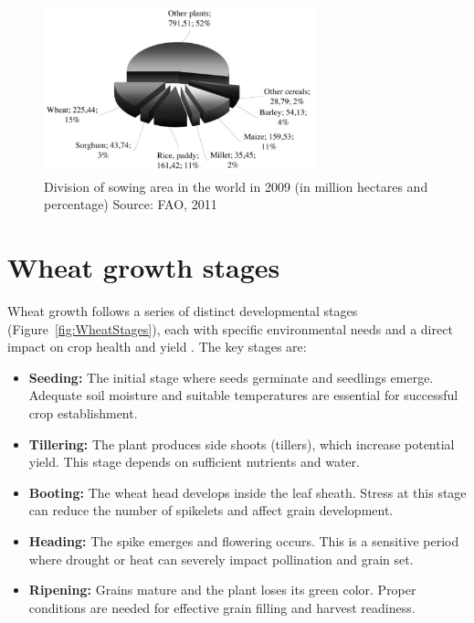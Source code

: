 \begin{figure}[H]
    \centering
    \includegraphics[width=0.7\textwidth]{chapters/chapter2/images/Figure01.png}
    \caption{Division of sowing area in the world in 2009 (in million hectares and percentage) Source: FAO, 2011}
    \label{fig:Figure01}
\end{figure}

\section{Wheat growth stages}
Wheat growth follows a series of distinct developmental stages (Figure~\ref{fig:WheatStages}), each with specific environmental needs and a direct impact on crop health and yield \parencite{shafi2020multi}. The key stages are:

\begin{itemize}
    \item \textbf{Seeding:} The initial stage where seeds germinate and seedlings emerge. Adequate soil moisture and suitable temperatures are essential for successful crop establishment.
    
    \item \textbf{Tillering:} The plant produces side shoots (tillers), which increase potential yield. This stage depends on sufficient nutrients and water.
    
    \item \textbf{Booting:} The wheat head develops inside the leaf sheath. Stress at this stage can reduce the number of spikelets and affect grain development.
    
    \item \textbf{Heading:} The spike emerges and flowering occurs. This is a sensitive period where drought or heat can severely impact pollination and grain set.
    
    \item \textbf{Ripening:} Grains mature and the plant loses its green color. Proper conditions are needed for effective grain filling and harvest readiness.
\end{itemize}

